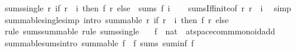 \begin{isabellebody}
\isanewline
{}\isamarkupfalse%
\ sums{\isacharunderscore}{\kern0pt}single{\isacharcolon}{\kern0pt}\ {\isachardoublequoteopen}{\isacharparenleft}{\kern0pt}{\isasymlambda}r{\isachardot}{\kern0pt}\ if\ r\ {\isacharequal}{\kern0pt}\ i\ then\ f\ r\ else\ {}{\isacharparenright}{\kern0pt}\ sums\ f\ i{\isachardoublequoteclose}\isanewline
%
\isadelimproof
\ \ %
\endisadelimproof
%
\isatagproof
{}\isamarkupfalse%
\ sums{\isacharunderscore}{\kern0pt}If{\isacharunderscore}{\kern0pt}finite{\isacharbrackleft}{\kern0pt}of\ {\isachardoublequoteopen}{\isasymlambda}r{\isachardot}{\kern0pt}\ r\ {\isacharequal}{\kern0pt}\ i{\isachardoublequoteclose}{\isacharbrackright}{\kern0pt}\ \isamarkupfalse%
\ simp%
\endisatagproof
{\isafoldproof}%
%
\isadelimproof
\isanewline
%
\endisadelimproof
\isanewline
{}\isamarkupfalse%
\ summable{\isacharunderscore}{\kern0pt}single{\isacharbrackleft}{\kern0pt}simp{\isacharcomma}{\kern0pt}\ intro{\isacharbrackright}{\kern0pt}{\isacharcolon}{\kern0pt}\ {\isachardoublequoteopen}summable\ {\isacharparenleft}{\kern0pt}{\isasymlambda}r{\isachardot}{\kern0pt}\ if\ r\ {\isacharequal}{\kern0pt}\ i\ then\ f\ r\ else\ {}{\isacharparenright}{\kern0pt}{\isachardoublequoteclose}\isanewline
%
\isadelimproof
\ \ %
\endisadelimproof
%
\isatagproof
{}\isamarkupfalse%
\ {\isacharparenleft}{\kern0pt}rule\ sums{\isacharunderscore}{\kern0pt}summable{\isacharparenright}{\kern0pt}\ {\isacharparenleft}{\kern0pt}rule\ sums{\isacharunderscore}{\kern0pt}single{\isacharparenright}{\kern0pt}%
\endisatagproof
{\isafoldproof}%
%
\isadelimproof
\isanewline
%
\endisadelimproof
\isanewline
{}\isamarkupfalse%
\isanewline
\ \ \ f\ {\isacharcolon}{\kern0pt}{\isacharcolon}{\kern0pt}\ {\isachardoublequoteopen}nat\ {\isasymRightarrow}\ {\isacharprime}{\kern0pt}a{\isacharcolon}{\kern0pt}{\isacharcolon}{\kern0pt}{\isacharbraceleft}{\kern0pt}t{}{\isacharunderscore}{\kern0pt}space{\isacharcomma}{\kern0pt}comm{\isacharunderscore}{\kern0pt}monoid{\isacharunderscore}{\kern0pt}add{\isacharbraceright}{\kern0pt}{\isachardoublequoteclose}\isanewline
{}\isanewline
\isanewline
{}\isamarkupfalse%
\ summable{\isacharunderscore}{\kern0pt}sums{\isacharbrackleft}{\kern0pt}intro{\isacharbrackright}{\kern0pt}{\isacharcolon}{\kern0pt}\ {\isachardoublequoteopen}summable\ f\ {\isasymLongrightarrow}\ f\ sums\ {\isacharparenleft}{\kern0pt}suminf\ f{\isacharparenright}{\kern0pt}{\isachardoublequoteclose}\isanewline
%
\isadelimproof
\ \ %

\end{isabellebody}
